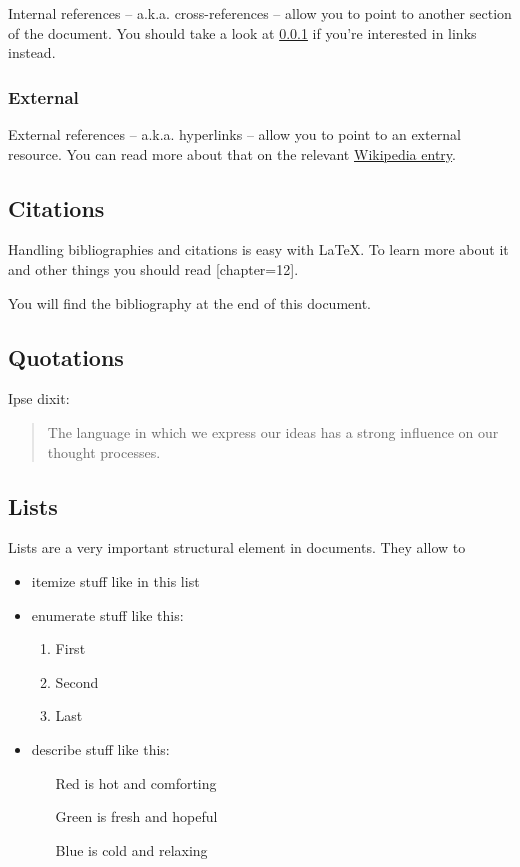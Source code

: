 \documentclass{metanorma}
\begin{document}
Internal references -- a.k.a. cross-references -- allow you to point to another section of the document.
You should take a look at \ref{sec:references__external} if you're interested in links instead.

\subsubsection{External}\label{sec:references__external}

External references -- a.k.a. hyperlinks -- allow you to point to an external resource.
You can read more about that on the relevant \href{https://en.wikipedia.org/wiki/Hyperlink}{Wikipedia entry}.

\subsection{Citations}

Handling bibliographies and citations is easy with \LaTeX.
To learn more about it and other things you should read [chapter=12].

You will find the bibliography at the end of this document.

\subsection{Quotations}

Ipse dixit:

\begin{quote}
  The language in which we express our ideas has a strong influence on our thought processes.
\end{quote}

\subsection{Lists}

Lists are a very important structural element in documents. They allow to

\begin{itemize}
  \item itemize stuff like in this list
  \item enumerate stuff like this:
  \begin{enumerate}
    \item First
    \item Second
    \item Last
  \end{enumerate}
  \item describe stuff like this:
  \begin{enumerate}
    \item[Red] is hot and comforting
    \item[Green] is fresh and hopeful
    \item[Blue] is cold and relaxing
  \end{enumerate}
\end{itemize}
\end{document}
